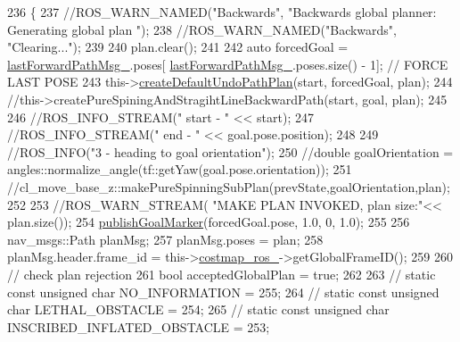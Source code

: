 \begin{DoxyCode}
236         \{
237             \textcolor{comment}{//ROS\_WARN\_NAMED("Backwards", "Backwards global planner: Generating global plan ");}
238             \textcolor{comment}{//ROS\_WARN\_NAMED("Backwards", "Clearing...");}
239 
240             plan.clear();
241 
242             \textcolor{keyword}{auto} forcedGoal = \hyperlink{classcl__move__base__z_1_1undo__path__global__planner_1_1UndoPathGlobalPlanner_a9a4a6e40f5b6cb5f77dedbc5b6170871}{lastForwardPathMsg\_}.poses[
      \hyperlink{classcl__move__base__z_1_1undo__path__global__planner_1_1UndoPathGlobalPlanner_a9a4a6e40f5b6cb5f77dedbc5b6170871}{lastForwardPathMsg\_}.poses.size() - 1]; \textcolor{comment}{// FORCE LAST POSE}
243             this->\hyperlink{classcl__move__base__z_1_1undo__path__global__planner_1_1UndoPathGlobalPlanner_a659c16f439d33ac7026a54bb65c26ca8}{createDefaultUndoPathPlan}(start, forcedGoal, plan);
244             \textcolor{comment}{//this->createPureSpiningAndStragihtLineBackwardPath(start, goal, plan);}
245 
246             \textcolor{comment}{//ROS\_INFO\_STREAM(" start - " << start);}
247             \textcolor{comment}{//ROS\_INFO\_STREAM(" end - " << goal.pose.position);}
248 
249             \textcolor{comment}{//ROS\_INFO("3 - heading to goal orientation");}
250             \textcolor{comment}{//double goalOrientation = angles::normalize\_angle(tf::getYaw(goal.pose.orientation));}
251             \textcolor{comment}{//cl\_move\_base\_z::makePureSpinningSubPlan(prevState,goalOrientation,plan);}
252 
253             \textcolor{comment}{//ROS\_WARN\_STREAM( "MAKE PLAN INVOKED, plan size:"<< plan.size());}
254             \hyperlink{classcl__move__base__z_1_1undo__path__global__planner_1_1UndoPathGlobalPlanner_a37a85e1cd57173902d8302cb8cb9b933}{publishGoalMarker}(forcedGoal.pose, 1.0, 0, 1.0);
255 
256             nav\_msgs::Path planMsg;
257             planMsg.poses = plan;
258             planMsg.header.frame\_id = this->\hyperlink{classcl__move__base__z_1_1undo__path__global__planner_1_1UndoPathGlobalPlanner_ab63eeb465e3ae989a6edcc4d059cf8f0}{costmap\_ros\_}->getGlobalFrameID();
259 
260             \textcolor{comment}{// check plan rejection}
261             \textcolor{keywordtype}{bool} acceptedGlobalPlan = \textcolor{keyword}{true};
262 
263             \textcolor{comment}{// static const unsigned char NO\_INFORMATION = 255;}
264             \textcolor{comment}{// static const unsigned char LETHAL\_OBSTACLE = 254;}
265             \textcolor{comment}{// static const unsigned char INSCRIBED\_INFLATED\_OBSTACLE = 253;}

\end{DoxyCode}
